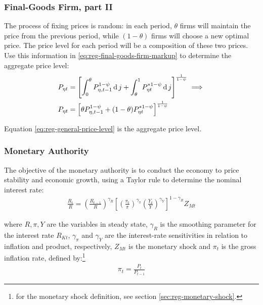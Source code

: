 \documentclass[../thesis.tex]{subfiles}
\begin{document}
\subsubsection*{Final-Goods Firm, part II}

The process of fixing prices is random: in each period, $\theta$ firms will maintain the price from the previous period, while $(1-\theta)$ firms will choose a new optimal price. The price level for each period will be a composition of these two prices. Use this information in \ref{eq:reg-final-goods-firm-markup} to determine the aggregate price level:
\begin{align}
	P_{\eta t} & = \left[ \int_{0}^{\theta} P_{\eta, t-1}^{1-\psi} \operatorname{d} j + \int_{\theta}^{1} P_{\eta t}^{\ast 1-\psi} \operatorname{d} j \right]^{\frac{1}{1-\psi}}  \implies \nonumber \\
	P_{\eta t} & = \left[ \theta P_{\eta, t-1}^{1-\psi} + (1-\theta) P_{\eta t}^{\ast 1-\psi} \right]^\frac{1}{1-\psi} \label{eq:reg-general-price-level}
\end{align}

Equation \ref{eq:reg-general-price-level} is the aggregate price level.


\subsubsection{Monetary Authority}

The objective of the monetary authority is to conduct the economy to price stability and economic growth, using a Taylor rule \cite{taylor_discretion_1993} to determine the nominal interest rate:
\begin{align}
	\label{eq:reg-monetary-policy}
	\frac{R_{t}}{R} =
	\left( \frac{R_{t-1}}{R} \right)^{\gamma_R}  \left[
	\left( \frac{\pi_t}{\pi} \right)^{\gamma_\pi}
	\left( \frac{Y_{t}}{Y} \right)^{\gamma_Y} \right]^{1-\gamma_R} Z_{Mt}
\end{align}

where $R, \pi, Y$ are the variables in steady state, $\gamma_R$ is the smoothing parameter for the interest rate $R_{Kt}$, $\gamma_\pi$ and $\gamma_Y$ are the interest-rate sensitivities in relation to inflation and product, respectively, $Z_{Mt}$ is the monetary shock and $\pi_t$ is the gross inflation rate, defined by:\footnote{for the monetary shock definition, see section \ref{sec:reg-monetary-shock}.}
\begin{align}
	\pi_t = \frac{P_t}{P_{t-1}}
	\label{eq:reg-gross-inflation-rate}
\end{align}
\end{document}
